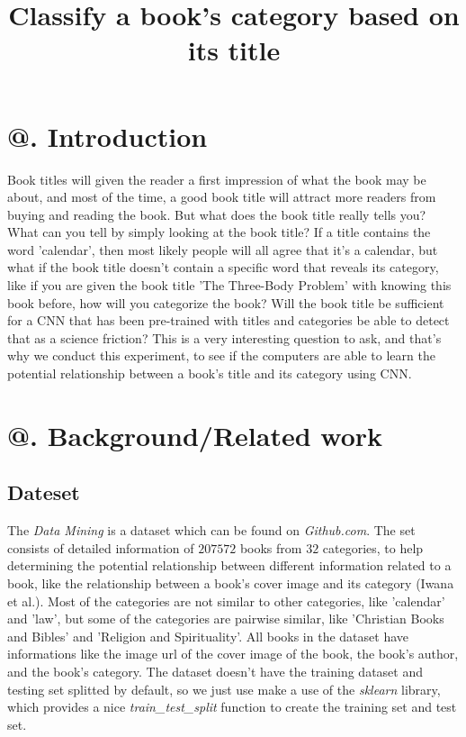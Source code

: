 \documentclass[jou,apacite, 10px]{apa6}
\title{Classify a book's category based on its title}
\makeatletter
\newcommand*{\rom}[1]{\expandafter\@slowromancap\romannumeral #1@}
\makeatother
\begin{document}
\maketitle    
                        
\section{\rom{1}. Introduction}
Book titles will given the reader a first impression of what the book may be about, and most of the time, a good book title will attract more readers from buying and reading the book. But what does the book title really tells you? What can you tell by simply looking at the book title? If a title contains the word 'calendar', then most likely people will all agree that it's a calendar, but what if the book title doesn't contain a specific word that reveals its category, like if you are given the book title 'The Three-Body Problem' with knowing this book before, how will you categorize the book? Will the book title be sufficient for a CNN that has been pre-trained with titles and categories be able to detect that as a science friction? This is a very interesting question to ask, and that's why we conduct this experiment, to see if the computers are able to learn the potential relationship between a book's title and its category using CNN.\\

\section{\rom{2}. Background/Related work}

\subsection{Dateset}
The \textit{Data Mining} is a dataset which can be found on \textit{Github.com}. The set consists of detailed information of $207572$  books from $32$ categories, to help determining the potential relationship between different information related to a book, like the relationship between a book's cover image and its category (Iwana et al.). Most of the categories are not similar to other categories, like 'calendar' and 'law', but some of the categories are pairwise similar, like 'Christian Books and Bibles' and 'Religion and Spirituality'. All books in the dataset have informations like the image url of the cover image of the book, the book's author, and the book's category. The dataset doesn't have the training dataset and testing set splitted by default, so we just use make a use of the \textit{sklearn} library, which provides a nice \textit{train\_test\_split} function to create the training set and test set.
\end{document}
